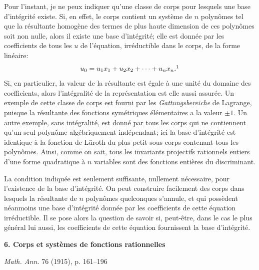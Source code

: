 \documentclass[11pt]{article}
\providecommand{\Kfield}{\mathfrak{K}}
\providecommand{\Ssys}{\mathfrak{S}}
\providecommand{\Lsys}{\mathfrak{L}}
\providecommand{\Jdom}{\mathfrak{J}}
\begin{document}
Pour l'instant, je ne peux indiquer qu'une classe de corps pour lesquels une base d'intégrité existe. Si, en effet, le corps contient un système de $n$ polynômes tel que la résultante homogène des termes de plus haute dimension de ces polynômes soit non nulle, alors il existe une base d'intégrité; elle est donnée par les coefficients de tous les $u$ de l'équation, irréductible dans le corps, de la forme linéaire:
\[
  u_0=u_1x_1+u_2x_2+\cdots+u_nx_n.\footnotemark
\]
Si, en particulier, la valeur de la résultante est égale à une unité du domaine des coefficients, alors l'intégralité de la représentation est elle aussi assurée. Un exemple de cette classe de corps est fourni par les \emph{Gattungsbereiche} de Lagrange, puisque la résultante des fonctions symétriques élémentaires a la valeur $\pm 1$. Un autre exemple, sans intégralité, est donné par tous les corps qui ne contiennent qu'un seul polynôme algébriquement indépendant; ici la base d'intégrité est identique à la fonction de Lüroth du plus petit sous-corps contenant tous les polynômes. Ainsi, comme on sait, tous les invariants projectifs rationnels entiers d'une forme quadratique à $n$ variables sont des fonctions entières du discriminant.

La condition indiquée est seulement suffisante, nullement nécessaire, pour l'existence de la base d'intégrité. On peut construire facilement des corps dans lesquels la résultante de $n$ polynômes quelconques s'annule, et qui possèdent néanmoins une base d'intégrité donnée par les coefficients de cette équation irréductible. Il se pose alors la question de savoir si, peut-être, dans le cas le plus général lui aussi, les coefficients de cette équation fournissent la base d'intégrité.

\clearpage
\setcounter{footnote}{0}
\providecommand{\Kfield}{\mathfrak{K}}
\providecommand{\Ssys}{\mathfrak{S}}
\providecommand{\Mfield}{\mathfrak{M}}
\providecommand{\Lsys}{\mathfrak{L}}
\providecommand{\Jdom}{\mathfrak{J}}

\begin{center}
{\Large\bfseries 6. Corps et systèmes de fonctions rationnelles}\par
\vspace{1.2em}
\emph{Math. Ann.} 76 (1915), p. 161--196
\end{center}

\vspace{1.5em}
\end{document}
